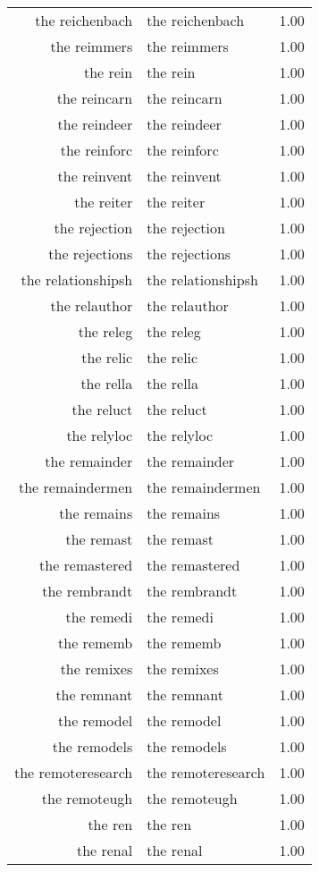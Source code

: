 \begin{table}[ht]
\begin{tabular}{rlr}
  the reichenbach & the reichenbach & 1.00 \\ 
  the reimmers & the reimmers & 1.00 \\ 
  the rein & the rein & 1.00 \\ 
  the reincarn & the reincarn & 1.00 \\ 
  the reindeer & the reindeer & 1.00 \\ 
  the reinforc & the reinforc & 1.00 \\ 
  the reinvent & the reinvent & 1.00 \\ 
  the reiter & the reiter & 1.00 \\ 
  the rejection & the rejection & 1.00 \\ 
  the rejections & the rejections & 1.00 \\ 
  the relationshipsh & the relationshipsh & 1.00 \\ 
  the relauthor & the relauthor & 1.00 \\ 
  the releg & the releg & 1.00 \\ 
  the relic & the relic & 1.00 \\ 
  the rella & the rella & 1.00 \\ 
  the reluct & the reluct & 1.00 \\ 
  the relyloc & the relyloc & 1.00 \\ 
  the remainder & the remainder & 1.00 \\ 
  the remaindermen & the remaindermen & 1.00 \\ 
  the remains & the remains & 1.00 \\ 
  the remast & the remast & 1.00 \\ 
  the remastered & the remastered & 1.00 \\ 
  the rembrandt & the rembrandt & 1.00 \\ 
  the remedi & the remedi & 1.00 \\ 
  the rememb & the rememb & 1.00 \\ 
  the remixes & the remixes & 1.00 \\ 
  the remnant & the remnant & 1.00 \\ 
  the remodel & the remodel & 1.00 \\ 
  the remodels & the remodels & 1.00 \\ 
  the remoteresearch & the remoteresearch & 1.00 \\ 
  the remoteugh & the remoteugh & 1.00 \\ 
  the ren & the ren & 1.00 \\ 
  the renal & the renal & 1.00 \\ 

\end{tabular}
\end{table}
